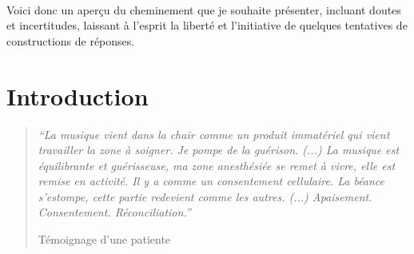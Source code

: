  \\
 Voici donc un aperçu du cheminement que je souhaite présenter, incluant doutes et incertitudes,
  laissant à l'esprit la liberté et l'initiative de quelques tentatives de constructions de réponses.


\chapter{Introduction}





\begin{quotation}
 \textit{``La musique vient dans la chair comme un produit immatériel
 qui vient travailler la zone à soigner. Je pompe de la
 guérison.
 (...)
 La musique est équilibrante et guérisseuse, ma zone
 anesthésiée se remet à vivre, elle est remise en activité.
 Il y a comme un consentement cellulaire.
La béance s'estompe, cette
partie redevient comme les autres. (...)
Apaisement. Consentement. Réconciliation.''}

Témoignage d'une patiente

\end{quotation}



